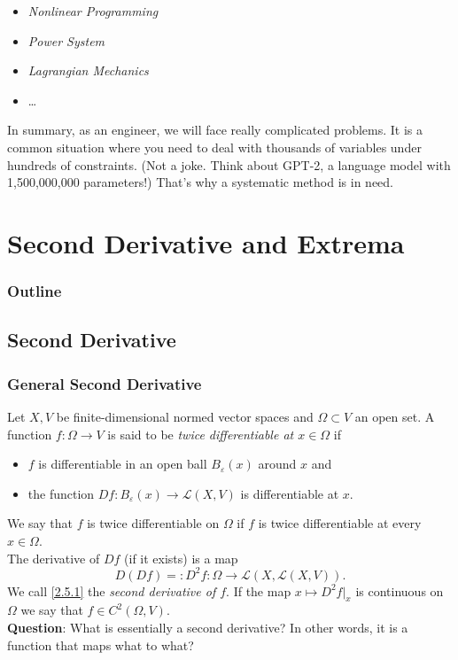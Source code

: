 \documentclass[10pt, t, allowdisplaybreaks]{beamer}
\renewcommand{\emph}[1]{{\color{Turquoise3}\textsl{#1}}}
\newcommand{\nullspace}{~\\[15pt]}
\begin{document}
\begin{frame}[allowframebreaks]
\begin{itemize}
        \item \emph{Nonlinear Programming}
        \item \emph{Power System}
        \item \emph{Lagrangian Mechanics}
        \item \dots
    \end{itemize}
    In summary, as an engineer, we will face really complicated problems. It is a common situation where you need to deal with thousands of variables under hundreds of constraints. (Not a joke. Think about GPT-2, a language model with 1,500,000,000 parameters!) That's why a systematic method is in need.
\end{frame}

\section{Second Derivative and Extrema}
\begin{frame}
    \frametitle{Outline}
    \begin{spacing}{2.5}
        \tableofcontents[currentsubsection,hideothersubsections,sectionstyle=hide]
    \end{spacing}
\end{frame}

\subsection{Second Derivative}
\begin{frame}
    \frametitle{General Second Derivative}
    Let $X,V$ be finite-dimensional normed vector spaces and $\Omega\subset V$ an open set. A function $f:\Omega\to V$ is said to be \emph{twice dif{}ferentiable at $x\in\Omega$} if
    \begin{itemize}
        \item $f$ is dif{}ferentiable in an open ball $B_{\varepsilon}(x)$ around $x$ and
        \item the function $Df:B_\varepsilon(x)\to\mathcal{L}(X,V)$ is dif{}ferentiable at $x$.
    \end{itemize}
    We say that $f$ is twice dif{}ferentiable on $\Omega$ if $f$ is twice dif{}ferentiable at every $x\in\Omega$.\\[5pt]
    The derivative of $Df$ (if it exists) is a map
    \setcounter{equation}{0}
    \begin{equation}\label{2.5.1}
        D(Df)=:D^2f:\Omega\to\mathcal{L}(X,\mathcal{L}
        (X,V)).
    \end{equation}
    We call \eqref{2.5.1} the \emph{second derivative of $f$}. If the map $x\mapsto D^2f|_x$ is continuous on $\Omega$ we say that $f\in C^2(\Omega,V)$.
    \nullspace
    \textbf{Question}: What is essentially a second derivative? In other words, it is a function that maps what to what?
\end{frame}
\end{document}
